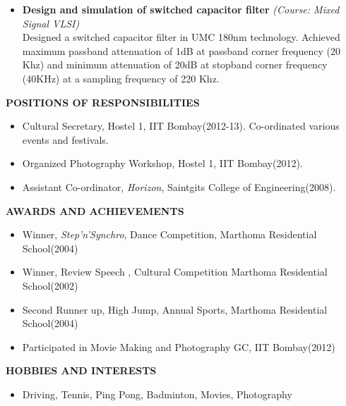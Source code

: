 \documentclass[a4paper,10pt]{article}
\begin{document}
\begin{itemize}
% 	
   \item \textbf{{Design and simulation of switched capacitor filter}} \textit{(Course: Mixed Signal VLSI)}\\
 	Designed a switched capacitor filter in UMC 180nm technology. Achieved maximum passband attenuation of 1dB at passband corner frequency (20 Khz)
 	and minimum attenuation of 20dB at stopband corner frequency (40KHz) at a sampling frequency of 220 Khz.  
 \end{itemize}
 \hspace{0.2in}\colorbox{titleColor}{\parbox{6.5in}{\textbf{POSITIONS OF RESPONSIBILITIES}}}
 \begin{itemize}
   \item Cultural Secretary, Hostel 1, IIT Bombay(2012-13). Co-ordinated various events and festivals.
   \item Organized Photography Workshop, Hostel 1, IIT Bombay(2012). 
   \item Assistant Co-ordinator, \textit{Horizon}, Saintgits College of Engineering(2008).
 \end{itemize}
 \hspace{0.2in}\colorbox{titleColor}{\parbox{6.5in}{\textbf{AWARDS AND ACHIEVEMENTS}}}
 \begin{itemize}
  \item Winner, \textit{Step'n'Synchro}, Dance Competition, Marthoma Residential School(2004)
  \item Winner, Review Speech , Cultural Competition Marthoma Residential School(2002)
  \item Second Runner up, High Jump, Annual Sports,  Marthoma Residential School(2004)
  \item Participated in Movie Making and Photography GC, IIT Bombay(2012) 
 \end{itemize}
 \hspace{0.2in}\colorbox{titleColor}{\parbox{6.5in}{\textbf{HOBBIES AND INTERESTS}}}
 \begin{itemize}
  \item Driving, Tennis, Ping Pong, Badminton, Movies, Photography
 \end{itemize}
\end{document}
